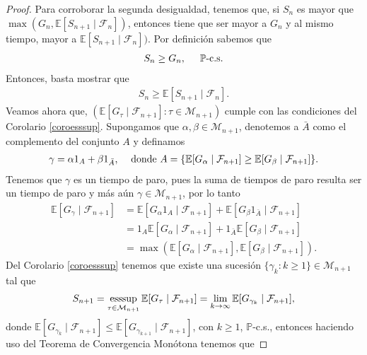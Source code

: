 \begin{proof}
Para corroborar la segunda desigualdad, tenemos que, si $S_n$ es mayor que $\max (G_n, \mathbb{E}[S_{n+1} \mid \mathcal{F}_n])$, entonces tiene que ser mayor a $G_n$ y al mismo tiempo, mayor a $\mathbb{E}[S_{n+1} \mid \mathcal{F}_n])$. Por definición sabemos que
	\begin{align}
	S_n \geq G_n, \hspace{0.5cm} \mathbb{P}\text{-c.s.}  \label{abh}
	\end{align}
Entonces, basta mostrar que 
	\begin{align*}
	S_n \geq \mathbb{E}[S_{n+1} \mid \mathcal{F}_n].
	\end{align*}
Veamos ahora que, $(\mathbb{E}[G_\tau \mid \mathcal{F}_{n+1}] : \tau \in \mathcal{M}_{n+1})$ cumple con las condiciones del Corolario \ref{coroesssup}. Supongamos que $\alpha, \beta \in \mathcal{M}_{n+1}$, denotemos a $\bar{A}$ como el complemento del conjunto $A$ y definamos
	\begin{align*}
	\gamma = \alpha 1_A + \beta 1_{\bar{A}}, \hspace{0.3cm} \text{ donde } A = \{\mathbb{E}[G_\alpha \mid \mathcal{F}_{n+1}] \geq \mathbb{E}[G_\beta \mid \mathcal{F}_{n+1}]\}.
	\end{align*}
Tenemos que $\gamma$ es un tiempo de paro, pues la suma de tiempos de paro resulta ser un tiempo de paro y más aún $\gamma \in \mathcal{M}_{n+1}$, por lo tanto
	\begin{align*}
	\mathbb{E}[G_\gamma \mid \mathcal{F}_{n+1}] & = \mathbb{E}[G_\alpha 1_A \mid \mathcal{F}_{n+1}] + \mathbb{E}[G_\beta 1_{\bar{A}} \mid \mathcal{F}_{n+1}] \\
	& = 1_A \mathbb{E}[G_\alpha \mid \mathcal{F}_{n+1}] + 1_{\bar{A}} \mathbb{E}[G_\beta \mid \mathcal{F}_{n+1}] \\
	& = \max(\mathbb{E}[G_\alpha \mid \mathcal{F}_{n+1}], \mathbb{E}[G_\beta \mid \mathcal{F}_{n+1}]).
	\end{align*}
Del Corolario \ref{coroesssup} tenemos que existe una sucesión $\{\gamma_k : k \geq 1\} \in \mathcal{M}_{n+1}$ tal que 
	\begin{align*}
	S_{n+1} = \operatorname*{esssup}_{\tau \in \mathcal{M}_{n+1}} \mathbb{E}[G_\tau \mid \mathcal{F}_{n+1}] = \lim_{k \rightarrow \infty} \mathbb{E}[G_{\gamma_k} \mid \mathcal{F}_{n+1}],
	\end{align*}
donde $\mathbb{E}[G_{\gamma_k} \mid \mathcal{F}_{n+1}] \leq \mathbb{E}[G_{\gamma_{k+1}} \mid \mathcal{F}_{n+1}]$, con $k \geq 1$, $\mathbb{P}$-c.s., entonces haciendo uso del Teorema de Convergencia Monótona tenemos que

\end{proof}

